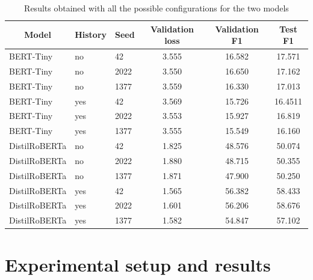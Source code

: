 \documentclass[11pt]{article}
\begin{document}

\begin{table}[!t]
\centering
\begin{tabular}{l|l|l|c|c|c}
\multicolumn{1}{c|}{\textbf{Model}} & \textbf{History} & \textbf{Seed} & \textbf{Validation loss} & \textbf{Validation F1} & \textbf{Test F1} \\ \hline
BERT-Tiny   & no    & 42    & 3.555		& 16.582   & 17.571\\
BERT-Tiny   & no    & 2022    & 3.550	& 16.650	& 17.162\\
BERT-Tiny   & no    & 1377    & 3.559	& 16.330	& 17.013\\
BERT-Tiny   & yes    & 42    & 3.569	& 15.726	& 16.4511\\
BERT-Tiny   & yes    & 2022    & 3.553	& 15.927	& 16.819\\
BERT-Tiny   & yes    & 1377    & 3.555	& 15.549	& 16.160\\
DistilRoBERTa   & no    & 42    & 1.825	& 48.576	& 50.074\\
DistilRoBERTa   & no    & 2022    & 1.880	& 48.715	& 50.355\\
DistilRoBERTa   & no    & 1377    & 1.871	& 47.900	& 50.250\\
DistilRoBERTa   & yes    & 42    & 1.565	& 56.382	& 58.433\\
DistilRoBERTa   & yes    & 2022    & 1.601	& 56.206	& 58.676\\
DistilRoBERTa   & yes    & 1377    & 1.582	& 54.847	& 57.102\\
\end{tabular}
\caption{Results obtained with all the possible configurations for the two models}
\label{table:1}
\end{table}

\section{Experimental setup and results}
\label{sec:results}

\end{document}
